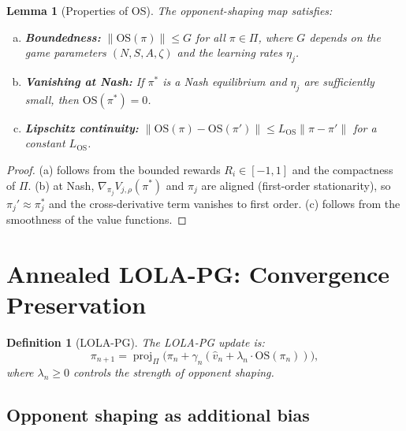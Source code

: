 \documentclass[11pt,a4paper]{article}
\newtheorem{lemma}[theorem]{Lemma}
\newtheorem{definition}[theorem]{Definition}
\DeclareMathOperator{\proj}{proj}
\begin{document}
\begin{lemma}[Properties of OS]
\label{lem:os-properties}
The opponent-shaping map satisfies:
\begin{enumerate}[(a)]
    \item \textbf{Boundedness:} $\|\mathrm{OS}(\pi)\| \leq G$ for all $\pi \in \Pi$, where $G$ depends on the game parameters $(N, S, A, \zeta)$ and the learning rates $\eta_j$.
    \item \textbf{Vanishing at Nash:} If $\pi^*$ is a Nash equilibrium and $\eta_j$ are sufficiently small, then $\mathrm{OS}(\pi^*) = 0$.
    \item \textbf{Lipschitz continuity:} $\|\mathrm{OS}(\pi) - \mathrm{OS}(\pi')\| \leq L_{\mathrm{OS}} \|\pi - \pi'\|$ for a constant $L_{\mathrm{OS}}$.
\end{enumerate}
\end{lemma}

\begin{proof}
(a) follows from the bounded rewards $R_i \in [-1,1]$ and the compactness of $\Pi$. (b) at Nash, $\nabla_{\pi_j} V_{j,\rho}(\pi^*)$ and $\pi_j$ are aligned (first-order stationarity), so $\pi_j' \approx \pi_j^*$ and the cross-derivative term vanishes to first order. (c) follows from the smoothness of the value functions.
\end{proof}


\section{Annealed LOLA-PG: Convergence Preservation}
\label{sec:annealed}

\begin{definition}[LOLA-PG]
\label{def:lola-pg}
The \emph{LOLA-PG} update is:
\begin{equation}
\label{eq:lola-pg}
\tag{LOLA-PG}
    \pi_{n+1} = \proj_\Pi\bigl(\pi_n + \gamma_n(\hat{v}_n + \lambda_n \cdot \mathrm{OS}(\pi_n))\bigr),
\end{equation}
where $\lambda_n \geq 0$ controls the strength of opponent shaping.
\end{definition}

\subsection{Opponent shaping as additional bias}
\end{document}
